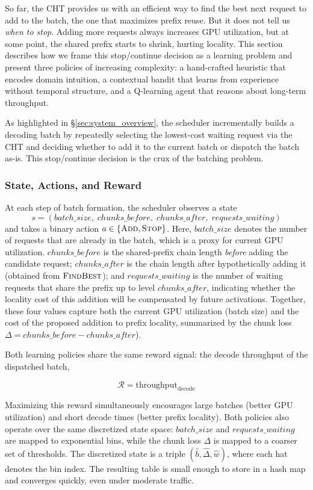 So far, the CHT provides us with an efficient way to find the best next request to add to the batch, the one that maximizes prefix reuse. But it does not tell us \emph{when to stop}. Adding more requests always increases GPU utilization, but at some point, the shared prefix starts to shrink, hurting locality. This section describes how we frame this stop/continue decision as a learning problem and present three policies of increasing complexity: a hand-crafted heuristic that encodes domain intuition, a contextual bandit that learns from experience without temporal structure, and a Q-learning agent that reasons about long-term throughput.

As highlighted in \S\ref{sec:system_overview}, the scheduler incrementally builds a decoding batch by repeatedly selecting the lowest-cost waiting request via the CHT and deciding whether to add it to the current batch or dispatch the batch as-is. This stop/continue decision is the crux of the batching problem. 

\subsubsection*{State, Actions, and Reward}
At each step of batch formation, the scheduler observes a state
\[
s = (\mathit{batch\_size},\; \mathit{chunks\_before},\; \mathit{chunks\_after},\;\mathit{requests\_waiting})
\]
and takes a binary action $a \in \{\textsc{Add}, \textsc{Stop}\}$. Here, $\mathit{batch\_size}$ denotes the number of requests that are already in the batch, which is a proxy for current GPU utilization. $\mathit{chunks\_before}$ is the shared-prefix chain length \emph{before} adding the candidate request; $\mathit{chunks\_after}$ is the chain length after hypothetically adding it (obtained from $\textsc{FindBest}$); and $\mathit{requests\_waiting}$ is the number of waiting requests that share the prefix up to level $\mathit{chunks\_after}$, indicating whether the locality cost of this addition will be compensated by future activations. Together, these four values capture both the current GPU utilization (batch size) and the cost of the proposed addition to prefix locality, summarized by the chunk loss $\Delta = \mathit{chunks\_before} - \mathit{chunks\_after}$).

Both learning policies share the same reward signal: the decode throughput of the dispatched batch,

\[
\mathcal{R} = \text{throughput}_{\mathrm{decode}}
\]

Maximizing this reward simultaneously encourages large batches (better GPU utilization) and short decode times (better prefix locality). Both policies also operate over the same discretized state space: $\mathit{batch\_size}$ and $\mathit{requests\_waiting}$ are mapped to exponential bins, while the chunk loss $\Delta$ is mapped to a coarser set of thresholds. The discretized state is a triple $(\hat{b}, \hat{\Delta}, \hat{w})$, where each hat denotes the bin index. The resulting table is small enough to store in a hash map and converges quickly, even under moderate traffic.

